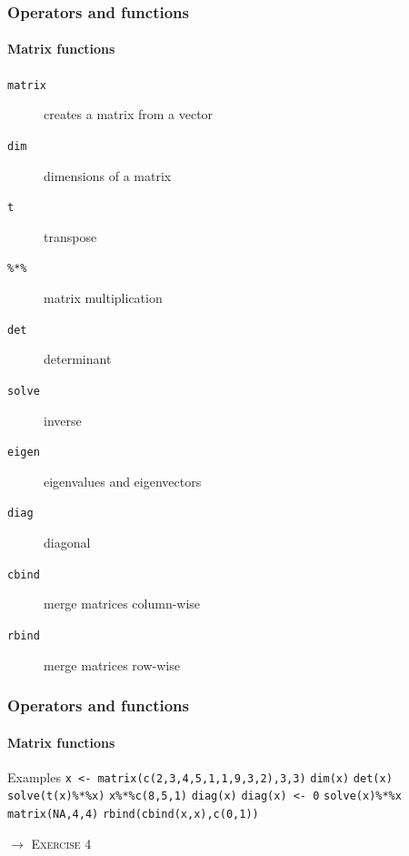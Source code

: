 \documentclass[title={Introduction to R}, author={Mutschler and Zaharieva}, inst={Institute for Econometrics and Empirical Economics}]{beamer}
\begin{document}
\begin{frame}
\frametitle{Operators and functions}
\framesubtitle{Matrix functions}
\begin{description}
\item[\texttt{matrix}] creates a matrix from a vector
\item[\texttt{dim}] dimensions of a matrix
\item[\texttt{t}] transpose
\item[\texttt{\%*\%}] matrix multiplication
\item[\texttt{det}] determinant
\item[\texttt{solve}] inverse
\item[\texttt{eigen}] eigenvalues and eigenvectors
\item[\texttt{diag}] diagonal
\item[\texttt{cbind}] merge matrices column-wise
\item[\texttt{rbind}] merge matrices row-wise
\end{description}
\end{frame}


\begin{frame}
\frametitle{Operators and functions}
\framesubtitle{Matrix functions}
\begin{block}{Examples}
\texttt{x <- matrix(c(2,3,4,5,1,1,9,3,2),3,3)}\newline
\texttt{dim(x)}\newline
\texttt{det(x)}\newline
\texttt{solve(t(x)\%*\%x)}\newline
\texttt{x\%*\%c(8,5,1)}\newline
\texttt{diag(x)}\newline
\texttt{diag(x) <- 0}\newline
\texttt{solve(x)\%*\%x}\newline
\texttt{matrix(NA,4,4)}\newline
\texttt{rbind(cbind(x,x),c(0,1))}
\end{block}\pause
$\longrightarrow $ \textsc{Exercise 4}
\end{frame}
\end{document}
